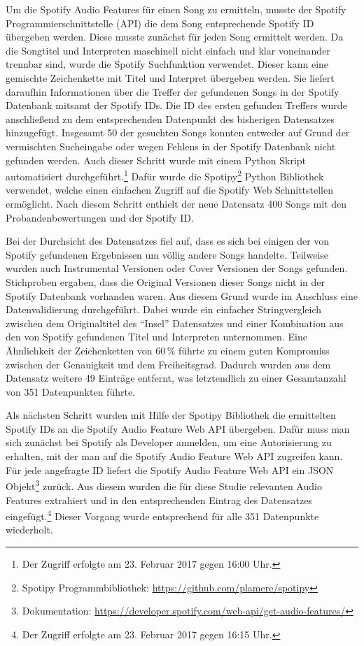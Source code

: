 Um die Spotify Audio Features für einen Song zu ermitteln, musste der Spotify Programmierschnittstelle (API) die dem Song entsprechende Spotify ID übergeben werden.
Diese musste zunächst für jeden Song ermittelt werden.
Da die Songtitel und Interpreten maschinell nicht einfach und klar voneinander trennbar sind, wurde die Spotify Suchfunktion verwendet.
Dieser kann eine gemischte Zeichenkette mit Titel und Interpret übergeben werden.
Sie liefert daraufhin Informationen über die Treffer der gefundenen Songs in der Spotify Datenbank mitsamt der Spotify IDs.
Die ID des ersten gefunden Treffers wurde anschließend zu dem entsprechenden Datenpunkt des bisherigen Datensatzes hinzugefügt.
Insgesamt 50 der gesuchten Songs konnten entweder auf Grund der vermischten Sucheingabe oder wegen Fehlens in der Spotify Datenbank nicht gefunden werden.
Auch dieser Schritt wurde mit einem Python Skript automatisiert durchgeführt.\footnote{Der Zugriff erfolgte am 23. Februar 2017 gegen 16:00 Uhr.}
Dafür wurde die Spotipy\footnote{Spotipy Programmbibliothek: \url{https://github.com/plamere/spotipy}} Python Bibliothek verwendet, welche einen einfachen Zugriff auf die Spotify Web Schnittstellen ermöglicht.
Nach diesem Schritt enthielt der neue Datensatz 400 Songs mit den Probandenbewertungen und der Spotify ID.

Bei der Durchsicht des Datensatzes fiel auf, dass es sich bei einigen der von Spotify gefundenen Ergebnissen um völlig andere Songs handelte.
Teilweise wurden auch Instrumental Versionen oder Cover Versionen der Songs gefunden.
Stichproben ergaben, dass die Original Versionen dieser Songs nicht in der Spotify Datenbank vorhanden waren.
Aus diesem Grund wurde im Anschluss eine Datenvalidierung durchgeführt.
Dabei wurde ein einfacher Stringvergleich zwischen dem Originaltitel des "`Insel"' Datensatzes und einer Kombination aus den von Spotify gefundenen Titel und Interpreten unternommen.
Eine Ähnlichkeit der Zeichenketten von 60\,\% führte zu einem guten Kompromiss zwischen der Genauigkeit und dem Freiheitsgrad.
Dadurch wurden aus dem Datensatz weitere 49 Einträge entfernt, was letztendlich zu einer Gesamtanzahl von 351 Datenpunkten führte.

Als nächsten Schritt wurden mit Hilfe der Spotipy Bibliothek die ermittelten Spotify IDs an die Spotify Audio Feature Web API  übergeben.
Dafür muss man sich zunächst bei Spotify als Developer anmelden, um eine Autorisierung zu erhalten, mit der man auf die Spotify Audio Feature Web API zugreifen kann.
Für jede angefragte ID liefert die Spotify Audio Feature Web API ein JSON Objekt\footnote{Dokumentation: \url{https://developer.spotify.com/web-api/get-audio-features/}} zurück.
Aus diesem wurden die für diese Studie relevanten Audio Features extrahiert und in den entsprechenden Eintrag des Datensatzes eingefügt.\footnote{Der Zugriff erfolgte am 23. Februar 2017 gegen 16:15 Uhr.}
Dieser Vorgang wurde entsprechend für alle 351 Datenpunkte wiederholt.

